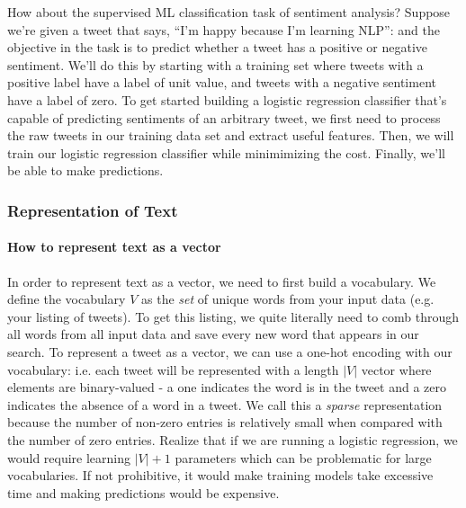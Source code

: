 \documentclass[12pt]{article}
\begin{document}
How about the supervised ML classification task of sentiment analysis? Suppose we're given a tweet that says, ``I'm happy because I'm learning NLP'': and the objective in the task is to predict whether a tweet has a positive or negative sentiment. We'll do this by starting with a training set where tweets with a positive label have a label of unit value, and tweets with a negative sentiment have a label of zero.
To get started building a logistic regression classifier that's capable of predicting sentiments of an arbitrary tweet, we first need to process the raw tweets in our training data set and extract useful features. Then, we will train our logistic regression classifier while minimimizing the cost. Finally, we'll be able to make predictions.

\subsubsection{Representation of Text}
\paragraph{How to represent text as a vector} In order to represent text as a vector, we need to first build a vocabulary. We define the vocabulary $V$ as the \emph{set} of unique words from your input data (e.g. your listing of tweets). To get this listing, we quite literally need to comb through all words from all input data and save every new word that appears in our search.
To represent a tweet as a vector, we can use a one-hot encoding with our vocabulary: i.e. each tweet will be represented with a length $|V|$ vector where elements are binary-valued - a one indicates the word is in the tweet and a zero indicates the absence of a word in a tweet. We call this a \emph{sparse} representation because the number of non-zero entries is relatively small when compared with the number of zero entries. Realize that if we are running a logistic regression, we would require learning $|V| + 1$ parameters which can be problematic for large vocabularies. If not prohibitive, it would make training models take excessive time and making predictions would be expensive.
\end{document}
